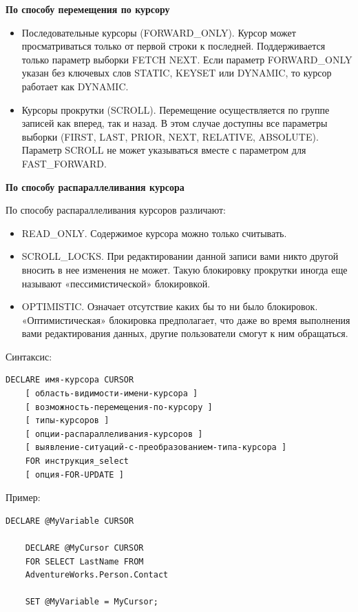 \textbf{По способу перемещения по курсору}
\begin{itemize}
	\item Последовательные курсоры (FORWARD\_ONLY). Курсор может просматриваться только от
	первой строки к последней. Поддерживается только параметр выборки FETCH NEXT. Если
	параметр FORWARD\_ONLY указан без ключевых слов STATIC, KEYSET или DYNAMIC,
	то курсор работает как DYNAMIC.
	\item Курсоры прокрутки (SCROLL). Перемещение осуществляется по группе записей как
	вперед, так и назад. В этом случае доступны все параметры выборки (FIRST, LAST, PRIOR,
	NEXT, RELATIVE, ABSOLUTE). Параметр SCROLL не может указываться вместе с
	параметром для FAST\_FORWARD.
\end{itemize}

\textbf{По способу распараллеливания курсора}

По способу распараллеливания курсоров различают:
\begin{itemize}
	\item READ\_ONLY. Содержимое курсора можно только считывать.
	\item SCROLL\_LOCKS. При редактировании данной записи вами никто другой вносить в нее
	изменения не может. Такую блокировку прокрутки иногда еще называют
	«пессимистической» блокировкой.
	\item OPTIMISTIC. Означает отсутствие каких бы то ни было блокировок. «Оптимистическая»
	блокировка предполагает, что даже во время выполнения вами редактирования данных,
	другие пользователи смогут к ним обращаться.
\end{itemize}

Синтаксис:
\begin{lstlisting}[label=curssint]
	DECLARE имя-курсора CURSOR
	[ область-видимости-имени-курсора ]
	[ возможность-перемещения-по-курсору ]
	[ типы-курсоров ]
	[ опции-распараллеливания-курсоров ]
	[ выявление-ситуаций-с-преобразованием-типа-курсора ]
	FOR инструкция_select
	[ опция-FOR-UPDATE ]
\end{lstlisting}
Пример:
\begin{lstlisting}[label=cursexample]
	DECLARE @MyVariable CURSOR
	
	DECLARE @MyCursor CURSOR
	FOR SELECT LastName FROM
	AdventureWorks.Person.Contact
	
	SET @MyVariable = MyCursor; 
\end{lstlisting}

